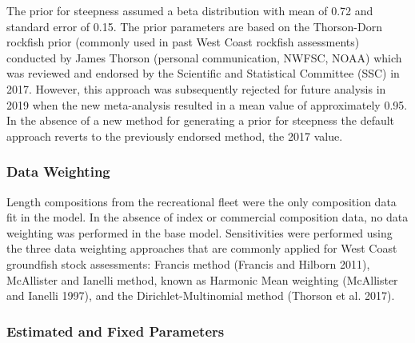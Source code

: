 \documentclass[11pt,
  english,
  a4paper,
]{article}
\begin{document}
The prior for steepness assumed a beta distribution with mean of 0.72 and standard error of 0.15. The prior parameters are based on the Thorson-Dorn rockfish prior (commonly used in past West Coast rockfish assessments) conducted by James Thorson (personal communication, NWFSC, NOAA) which was reviewed and endorsed by the Scientific and Statistical Committee (SSC) in 2017. However, this approach was subsequently rejected for future analysis in 2019 when the new meta-analysis resulted in a mean value of approximately 0.95. In the absence of a new method for generating a prior for steepness the default approach reverts to the previously endorsed method, the 2017 value.

\leavevmode\tagmcend\tagstructend\par


\hypertarget{data-weighting}{%
\subsubsection{Data Weighting}\label{data-weighting}}

\leavevmode\tagmcend\tagstructend


Length compositions from the recreational fleet were the only composition data fit in the model. In the absence of index or commercial composition data, no data weighting was performed in the base model. Sensitivities were performed using the three data weighting approaches that are commonly applied for West Coast groundfish stock assessments: Francis method {(Francis and Hilborn 2011)\leavevmode\tagmcend\tagstructend}, McAllister and Ianelli method, known as Harmonic Mean weighting {(McAllister and Ianelli 1997)\leavevmode\tagmcend\tagstructend}, and the Dirichlet-Multinomial method {(Thorson et al. 2017)\leavevmode\tagmcend\tagstructend}.

\leavevmode\tagmcend\tagstructend\par


\hypertarget{estimated-and-fixed-parameters}{%
\subsubsection{Estimated and Fixed Parameters}\label{estimated-and-fixed-parameters}}
\end{document}

